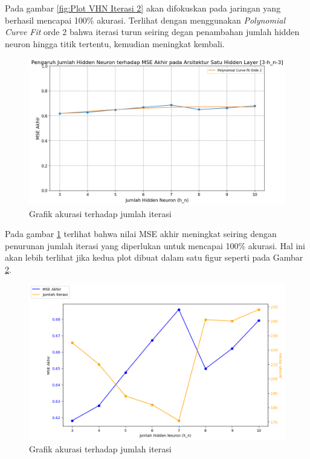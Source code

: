 Pada gambar \ref{fig:Plot VHN Iterasi 2} akan difokuskan pada jaringan yang berhasil mencapai 100\% akurasi. Terlihat dengan menggunakan \textit{Polynomial Curve Fit} orde 2 bahwa iterasi turun seiring degan penambahan jumlah hidden neuron hingga titik tertentu, kemudian meningkat kembali.

\begin{figure}[H]
    \centering
    \includegraphics[width=14cm]{contents/chapter-4/3.png}
    \caption{Grafik akurasi terhadap jumlah iterasi}
    \label{fig:Plot VHN MSE}
\end{figure}

Pada gambar \ref{fig:Plot VHN MSE} terlihat bahwa nilai MSE akhir meningkat seiring dengan penurunan jumlah iterasi yang diperlukan untuk mencapai 100\% akurasi. Hal ini akan lebih terlihat jika kedua plot dibuat dalam satu figur seperti pada Gambar \ref{fig:Plot VHN MSE Akurasi}.

\begin{figure}[H]
    \centering
    \includegraphics[width=14cm]{contents/chapter-4/4.png}
    \caption{Grafik akurasi terhadap jumlah iterasi}
    \label{fig:Plot VHN MSE Akurasi}
\end{figure}

